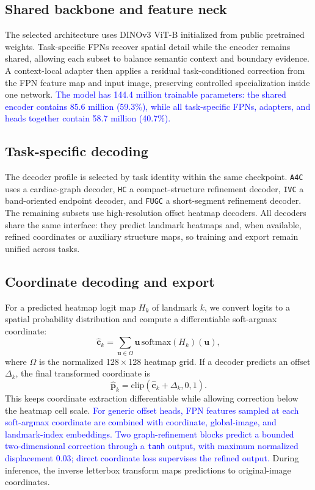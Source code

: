 \documentclass[runningheads]{llncs}
\newcommand{\revisiontext}[1]{\textcolor{blue}{#1}}
\begin{document}
\subsection{Shared backbone and feature neck}
The selected architecture uses DINOv3 ViT-B initialized from public pretrained weights. Task-specific FPNs recover spatial detail while the encoder remains shared, allowing each subset to balance semantic context and boundary evidence. A context-local adapter then applies a residual task-conditioned correction from the FPN feature map and input image, preserving controlled specialization inside one network. \revisiontext{The model has 144.4 million trainable parameters: the shared encoder contains 85.6 million (59.3\%), while all task-specific FPNs, adapters, and heads together contain 58.7 million (40.7\%).}

\subsection{Task-specific decoding}
The decoder profile is selected by task identity within the same checkpoint. \texttt{A4C} uses a cardiac-graph decoder, \texttt{HC} a compact-structure refinement decoder, \texttt{IVC} a band-oriented endpoint decoder, and \texttt{FUGC} a short-segment refinement decoder. The remaining subsets use high-resolution offset heatmap decoders. All decoders share the same interface: they predict landmark heatmaps and, when available, refined coordinates or auxiliary structure maps, so training and export remain unified across tasks.

\subsection{Coordinate decoding and export}
For a predicted heatmap logit map $H_k$ of landmark $k$, we convert logits to a spatial probability distribution and compute a differentiable soft-argmax coordinate:
\begin{equation}
\hat{\mathbf{c}}_k =
\sum_{\mathbf{u}\in\Omega} \mathbf{u}\,
\mathrm{softmax}(H_k)(\mathbf{u}),
\end{equation}
where $\Omega$ is the normalized 128\,$\times$\,128 heatmap grid. If a decoder predicts an offset $\Delta_k$, the final transformed coordinate is
\begin{equation}
\hat{\mathbf{p}}_k =
\mathrm{clip}(\hat{\mathbf{c}}_k+\Delta_k,0,1).
\end{equation}
This keeps coordinate extraction differentiable while allowing correction below the heatmap cell scale. \revisiontext{For generic offset heads, FPN features sampled at each soft-argmax coordinate are combined with coordinate, global-image, and landmark-index embeddings. Two graph-refinement blocks predict a bounded two-dimensional correction through a \texttt{tanh} output, with maximum normalized displacement 0.03; direct coordinate loss supervises the refined output.} During inference, the inverse letterbox transform maps predictions to original-image coordinates.
\end{document}
